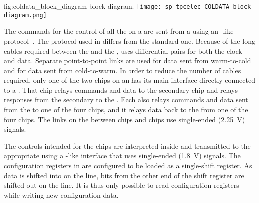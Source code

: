 \begin{dunefigure}
{fig:coldata_block_diagram}
{ block diagram.}
\texttt{[image: sp-tpcelec-COLDATA-block-diagram.png]}
\end{dunefigure}

The commands for the control of all the  on a  are sent 
from a   
using an -like protocol~\cite{bib:I2C}. The protocol used
in  differs from the standard  one.
Because of the long cables required between the  and the 
,  uses  differential pairs for both 
the  clock and data. Separate point-to-point links are used for
data sent from warm-to-cold and for data sent from cold-to-warm.
In order to reduce the number of cables required, only one of the two 
 chips on an  has its main  interface 
directly connected to a . That  chip relays  
commands and data to the secondary  chip and relays  
responses from the secondary  to the . 
Each   also relays  commands and data sent from the 
 to one of the four  chips, and it relays data back to
the  from one of the  four  chips. 
The links on the  between  
chips and  chips use single-ended (\SI{2.25}{V})  
signals.

The controls intended for the  chips are interpreted 
inside  and transmitted to the appropriate  using 
a -like interface that uses single-ended (\SI{1.8}{V})  
signals. The configuration registers in  are configured to be 
loaded as a single-shift register. As data is shifted into  on 
the  line, bits from the other end of the shift register are shifted 
out on the  line. It is thus only possible to read  
configuration registers while writing new configuration data.


